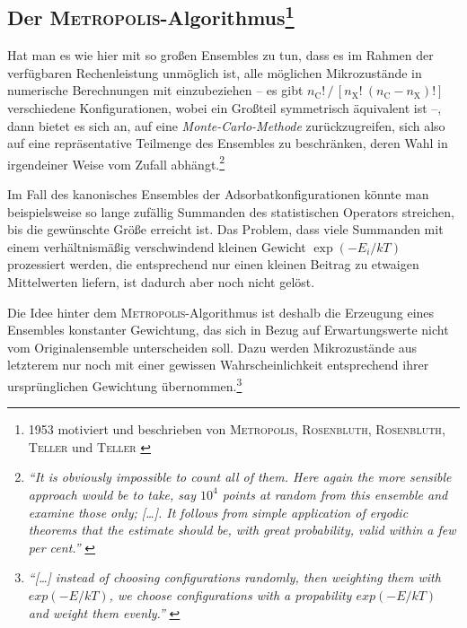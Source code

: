 \documentclass[a4paper, 10pt, twoside, openany]{book} %
\newcommand \bracks[1]{\left [ #1 \right ]}
\def \nC {n_\mathrm{C}}
\def \nX {n_\mathrm{X}}
\begin{document}
	\subsection[Der \textsc{Metropolis}-Algorithmus]{Der \textsc{Metropolis}-Algorithmus\footnote{1953 motiviert und beschrieben von \textsc{Metropolis}, \textsc{Rosenbluth}, \textsc{Rosenbluth}, \textsc{Teller} und \textsc{Teller} \cite{Metropolis2}}}
	
	Hat man es wie hier mit so großen Ensembles zu tun, dass es im Rahmen der verfügbaren Rechenleistung unmöglich ist, alle möglichen Mikrozustände in numerische Berechnungen mit einzubeziehen -- es gibt $\nC! \, / \, \bracks{\nX! \ (\nC - \nX)!}$ verschiedene Konfigurationen, wobei ein Großteil symmetrisch äquivalent ist --, dann bietet es sich an, auf eine \emph{Monte-Carlo-Methode} zurückzugreifen, sich also auf eine repräsentative Teilmenge des Ensembles zu beschränken, deren Wahl in irgendeiner Weise vom Zufall abhängt.\footnote{\emph{"`It is obviously impossible to count all of them. Here again the more sensible approach would be to take, say $10^4$ points at random from this ensemble and examine those only; \emph{[\dots]}. It follows from simple application of ergodic theorems that the estimate should be, with great probability, valid within a few per cent."'} \cite[S.~336f]{Metropolis1}}
	
	Im Fall des kanonisches Ensembles der Adsorbatkonfigurationen könnte man beispielsweise so lange zufällig Summanden des statistischen Operators streichen, bis die gewünschte Größe erreicht ist. Das Problem, dass viele Summanden mit einem verhältnismäßig verschwindend kleinen Gewicht $\exp(-E_i / k T)$ prozessiert werden, die entsprechend nur einen kleinen Beitrag zu etwaigen Mittelwerten liefern, ist dadurch aber noch nicht gelöst.
	
	Die Idee hinter dem \textsc{Metropolis}-Algorithmus ist deshalb die Erzeugung eines Ensembles konstanter Gewichtung, das sich in Bezug auf Erwartungswerte nicht vom Originalensemble unterscheiden soll. Dazu werden Mikrozustände aus letzterem nur noch mit einer gewissen Wahrscheinlichkeit entsprechend ihrer ursprünglichen Gewichtung übernommen.\footnote{\emph{"`\emph{[\dots]} instead of choosing configurations randomly, then weighting them with $exp(-E / k T)$, we choose configurations with a propability $exp(-E / k T)$ and weight them evenly."'} \cite[S.~1088]{Metropolis2}} 
	
\end{document}
